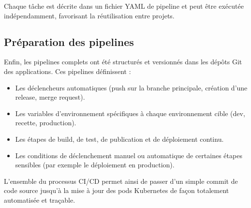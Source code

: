 Chaque tâche est décrite dans un fichier YAML de pipeline et peut être exécutée indépendamment, favorisant la réutilisation entre projets.

\subsection{Préparation des pipelines}

Enfin, les pipelines complets ont été structurés et versionnés dans les dépôts Git des applications.
Ces pipelines définissent :
\begin{itemize}
	\item Les déclencheurs automatiques (push sur la branche principale, création d’une release, merge request).
	\item Les variables d’environnement spécifiques à chaque environnement cible (dev, recette, production).
	\item Les étapes de build, de test, de publication et de déploiement continu.
	\item Les conditions de déclenchement manuel ou automatique de certaines étapes sensibles (par exemple le déploiement en production).
\end{itemize}

L’ensemble du processus CI/CD permet ainsi de passer d’un simple commit de code source jusqu’à la mise à jour des pods Kubernetes de façon totalement automatisée et traçable.